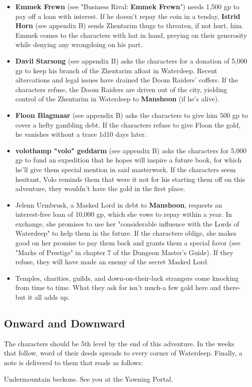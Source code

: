 \documentclass[10pt,a4paper,twoside,twocolumn,openany,nodeprecatedcode]{dndbook}
\begin{document}
\begin{itemize}

\item \textbf{Emmek Frewn} (see "Business Rival: \textbf{Emmek Frewn}") needs 1,500 gp to pay off a loan with interest. If he doesn't repay the coin in a tenday, \textbf{Istrid Horn} (see appendix B) sends Zhentarim thugs to threaten, if not hurt, him. Emmek comes to the characters with hat in hand, preying on their generosity while denying any wrongdoing on his part.
\item \textbf{Davil Starsong} (see appendix B) asks the characters for a donation of 5,000 gp to keep his branch of the Zhentarim afloat in Waterdeep. Recent altercations and legal issues have drained the Doom Raiders' coffers. If the characters refuse, the Doom Raiders are driven out of the city, yielding control of the Zhentarim in Waterdeep to \textbf{Manshoon} (if he's alive).
\item \textbf{Floon Blagmaar} (see appendix B) asks the characters to give him 500 gp to cover a hefty gambling debt. If the characters refuse to give Floon the gold, he vanishes without a trace 1d10 days later.
\item \textbf{volothamp "volo" geddarm} (see appendix B) asks the characters for 5,000 gp to fund an expedition that he hopes will inspire a future book, for which he'll give them special mention in said masterwork. If the characters seem hesitant, Volo reminds them that were it not for his starting them off on this adventure, they wouldn't have the gold in the first place.
\item Jelenn Urmbrusk, a Masked Lord in debt to \textbf{Manshoon}, requests an interest-free loan of 10,000 gp, which she vows to repay within a year. In exchange, she promises to use her "considerable influence with the Lords of Waterdeep" to help them in the future. If the characters oblige, she makes good on her promise to pay them back and grants them a special favor (see "Marks of Prestige" in chapter 7 of the Dungeon Master's Guide). If they refuse, they will have made an enemy of the secret Masked Lord.
\item Temples, charities, guilds, and down-on-their-luck strangers come knocking from time to time. What they ask for isn't much-a few gold here and there-but it all adds up.
\end{itemize}


\subsection{Onward and Downward}
The characters should be 5th level by the end of this adventure. In the weeks that follow, word of their deeds spreads to every corner of Waterdeep. Finally, a note is delivered to them that reads as follows:
\begin{DndReadAloud}{}
Undermountain beckons. See you at the Yawning Portal.
\end{DndReadAloud}
\end{document}
